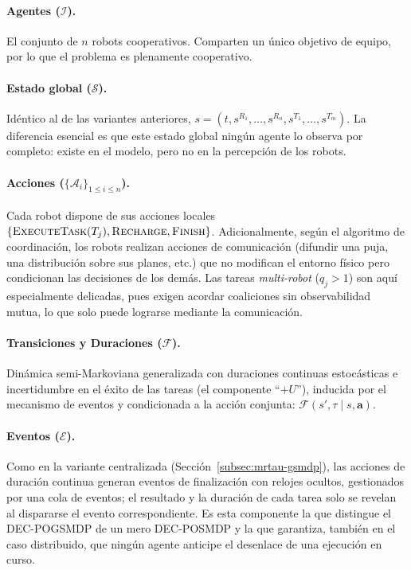 \paragraph{Agentes ($\mathcal{I}$).} El conjunto de $n$ robots cooperativos. Comparten un único objetivo de equipo, por lo que el problema es plenamente cooperativo.
 
\paragraph{Estado global ($\mathcal{S}$).} Idéntico al de las variantes anteriores, $s=(t,s^{R_1},\dots,s^{R_n},s^{T_1},\dots,s^{T_m})$. La diferencia esencial es que este estado global ningún agente lo observa por completo: existe en el modelo, pero no en la percepción de los robots.
 
\paragraph{Acciones ($\{\mathcal{A}_i\}_{1 \leq i \leq n}$).} Cada robot dispone de sus acciones locales $\{ \textsc{ExecuteTask}(T_j), \\ \textsc{Recharge}, \textsc{Finish} \}$. Adicionalmente, según el algoritmo de coordinación, los robots realizan acciones de comunicación (difundir una puja, una distribución sobre sus planes, etc.) que no modifican el entorno físico pero condicionan las decisiones de los demás. Las tareas \textit{multi-robot} ($q_j>1$) son aquí especialmente delicadas, pues exigen acordar coaliciones sin observabilidad mutua, lo que solo puede lograrse mediante la comunicación.

\paragraph{Transiciones y Duraciones ($\mathcal{F}$).} Dinámica semi-Markoviana generalizada con duraciones continuas estocásticas e incertidumbre en el éxito de las tareas (el componente ``$+U$''), inducida por el mecanismo de eventos y condicionada a la acción conjunta: $\mathcal{F}(s',\tau\mid s,\mathbf{a})$.
 
\paragraph{Eventos ($\mathcal{E}$).} Como en la variante centralizada (Sección~\ref{subsec:mrtau-gsmdp}), las acciones de duración continua generan eventos de finalización con relojes ocultos, gestionados por una cola de eventos; el resultado y la duración de cada tarea solo se revelan al dispararse el evento correspondiente. Es esta componente la que distingue el DEC-POGSMDP de un mero DEC-POSMDP y la que garantiza, también en el caso distribuido, que ningún agente anticipe el desenlace de una ejecución en curso. 

